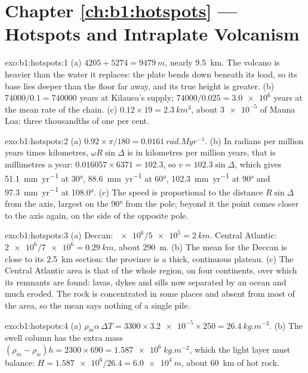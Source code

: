 \section*{Chapter \ref{ch:b1:hotspots} --- Hotspots and Intraplate Volcanism}

\begin{solution}{exo:b1:hotspots:1}
(a) $4205 + 5274 = \qty{9479}{m}$, nearly \qty{9.5}{km}. The volcano is
heavier than the water it replaces: the plate bends down beneath its load, so
its base lies deeper than the floor far away, and its true height is greater.
(b) $74000/0.1 = \num{740000}$ years at Kilauea's supply;
$74000/0.025 = \num{3.0e6}$ years at the mean rate of the chain. (c)
$0.12\times19 = \qty{2.3}{km^3}$, about $\num{3e-5}$ of Mauna Loa: three
thousandths of one per cent.
\end{solution}

\begin{solution}{exo:b1:hotspots:2}
(a) $0.92\times\pi/180 = \qty{0.0161}{rad.Myr^{-1}}$. (b) In radians per
million years times kilometres, $\omega R\sin\Delta$ is in kilometres per
million years, that is millimetres a year: $0.016057\times6371 = 102.3$, so
$v = 102.3\sin\Delta$, which gives \qty{51.1}{mm.yr^{-1}} at \ang{30},
\qty{88.6}{mm.yr^{-1}} at \ang{60}, \qty{102.3}{mm.yr^{-1}} at \ang{90} and
\qty{97.3}{mm.yr^{-1}} at \ang{108.0}. (c) The speed is proportional to the
distance $R\sin\Delta$ from the axis, largest on the  \ang{90}
from the pole; beyond it the point comes closer to the axis again, on the
side of the opposite pole.
\end{solution}

\begin{solution}{exo:b1:hotspots:3}
(a) Deccan: $\num{e6}/\num{5e5} = \qty{2}{km}$. Central Atlantic:
$\num{2e6}/\num{7e6} = \qty{0.29}{km}$, about \qty{290}{m}. (b) The mean for
the Deccan is close to its \qty{2.5}{km} section: the province is a thick,
continuous plateau. (c) The Central Atlantic
area is that of the whole region, on four continents, over which its
remnants are found: lavas, dykes and sills now separated by an ocean and much
eroded. The rock is concentrated in some places and absent from most of the
area, so the mean says nothing of a single pile.
\end{solution}

\begin{solution}{exo:b1:hotspots:4}
(a) $\rho_m\alpha\,\Delta T = 3300\times\num{3.2e-5}\times250 =
\qty{26.4}{kg.m^{-3}}$. (b) The swell column has the extra mass
$(\rho_m - \rho_w)h = 2300\times690 = \qty{1.587e6}{kg.m^{-2}}$, which the
light layer must balance: $H = \num{1.587e6}/26.4 = \qty{6.0e4}{m}$, about
\qty{60}{km} of hot rock.
\end{solution}

